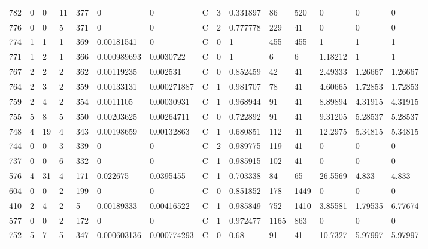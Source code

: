 \begin{latin}
\begin{longtable}{lllllllllllllll}
	782 & 0  & 0   & 11 & 377 & 0              & 0              & C & 3  & 0.331897 & 86   & 520  & 0       & 0       & 0       \\
	776 & 0  & 0   & 5  & 371 & 0              & 0              & C & 2  & 0.777778 & 229  & 41   & 0       & 0       & 0       \\
	774 & 1  & 1   & 1  & 369 & 0.00181541     & 0              & C & 0  & 1        & 455  & 455  & 1       & 1       & 1       \\
	771 & 1  & 2   & 1  & 366 & 0.000989693    & 0.0030722      & C & 0  & 1        & 6    & 6    & 1.18212 & 1       & 1       \\
	767 & 2  & 2   & 2  & 362 & 0.00119235     & 0.002531       & C & 0  & 0.852459 & 42   & 41   & 2.49333 & 1.26667 & 1.26667 \\
	764 & 2  & 3   & 2  & 359 & 0.00133131     & 0.000271887    & C & 1  & 0.981707 & 78   & 41   & 4.60665 & 1.72853 & 1.72853 \\
	759 & 2  & 4   & 2  & 354 & 0.0011105      & 0.00030931     & C & 1  & 0.968944 & 91   & 41   & 8.89894 & 4.31915 & 4.31915 \\
	755 & 5  & 8   & 5  & 350 & 0.00203625     & 0.00264711     & C & 0  & 0.722892 & 91   & 41   & 9.31205 & 5.28537 & 5.28537 \\
	748 & 4  & 19  & 4  & 343 & 0.00198659     & 0.00132863     & C & 1  & 0.680851 & 112  & 41   & 12.2975 & 5.34815 & 5.34815 \\
	744 & 0  & 0   & 3  & 339 & 0              & 0              & C & 2  & 0.989775 & 119  & 41   & 0       & 0       & 0       \\
	737 & 0  & 0   & 6  & 332 & 0              & 0              & C & 1  & 0.985915 & 102  & 41   & 0       & 0       & 0       \\
	576 & 4  & 31  & 4  & 171 & 0.022675       & 0.0395455      & C & 1  & 0.703338 & 84   & 65   & 26.5569 & 4.833   & 4.833   \\
	604 & 0  & 0   & 2  & 199 & 0              & 0              & C & 0  & 0.851852 & 178  & 1449 & 0       & 0       & 0       \\
	410 & 2  & 4   & 2  & 5   & 0.00189333     & 0.00416522     & C & 1  & 0.985849 & 752  & 1410 & 3.85581 & 1.79535 & 6.77674 \\
	577 & 0  & 0   & 2  & 172 & 0              & 0              & C & 1  & 0.972477 & 1165 & 863  & 0       & 0       & 0       \\
	752 & 5  & 7   & 5  & 347 & 0.000603136    & 0.000774293    & C & 0  & 0.68     & 91   & 41   & 10.7327 & 5.97997 & 5.97997 \\

\end{longtable}
\end{latin}
